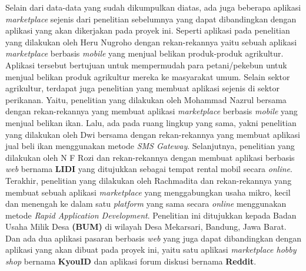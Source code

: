 \documentclass[a4paper]{article}
\begin{document}
Selain dari data-data yang sudah dikumpulkan diatas, ada juga beberapa aplikasi \textit{marketplace} sejenis dari penelitian sebelumnya yang dapat dibandingkan dengan aplikasi yang akan dikerjakan pada proyek ini. Seperti aplikasi pada penelitian yang dilakukan oleh Heru Nugroho dengan rekan-rekannya yaitu sebuah aplikasi \textit{marketplace} berbasis \textit{mobile} yang menjual belikan produk-produk agrikultur. Aplikasi tersebut bertujuan untuk mempermudah para petani/pekebun untuk menjual belikan produk agrikultur mereka ke masyarakat umum\autocite{agriculture-marketplace}. Selain sektor agrikultur, terdapat juga penelitian yang membuat aplikasi sejenis di sektor perikanan. Yaitu, penelitian yang dilakukan oleh Mohammad Nazrul bersama dengan rekan-rekannya yang membuat aplikasi \textit{marketplace} berbasis \textit{mobile} yang menjual belikan ikan\autocite{fishes-marketplace}. Lalu, ada pada ruang lingkup yang sama, yakni penelitian yang dilakukan oleh Dwi bersama dengan rekan-rekannya yang membuat aplikasi jual beli ikan menggunakan metode \textit{SMS Gateway}\autocite{c2c-fish-marketplace}. Selanjutnya, penelitian yang dilakukan oleh N F Rozi dan rekan-rekannya dengan membuat aplikasi berbasis \textit{web} bernama \textbf{LIDI} yang ditujukkan sebagai tempat rental mobil secara \textit{online}\autocite{lidi-car-rental}. Terakhir, penelitian yang dilakukan oleh Rachmadita dan rekan-rekannya yang membuat sebuah aplikasi \textit{marketplace} yang menggabungkan usaha mikro, kecil dan menengah ke dalam satu \textit{platform} yang sama secara \textit{online} menggunakan metode \textit{Rapid Application Development}. Penelitian ini ditujukkan kepada Badan Usaha Milik Desa \textbf{(BUM)} di wilayah Desa Mekarsari, Bandung, Jawa Barat\autocite{bum-mekarsari}. Dan ada dua aplikasi pasaran berbasis \textit{web} yang juga dapat dibandingkan dengan aplikasi yang akan dibuat pada proyek ini, yaitu satu aplikasi \textit{marketplace hobby shop} bernama \textbf{KyouID} dan aplikasi forum diskusi bernama \textbf{Reddit}.
\end{document}
